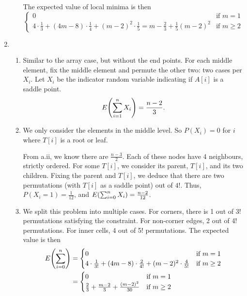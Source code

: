 \documentclass[12pt,a4paper]{article}
\begin{document}
\begin{enumerate}[label=(\alph*)]
\begin{enumerate}[label=(\roman*)]
			The expected value of local minima is then
			$$
			\begin{cases}
				0 & \text{if } m = 1 \\
				4 \cdot \frac{1}{3} + (4m - 8) \cdot \frac{1}{4}
				+ (m - 2)^2 \cdot \frac{1}{5} = m - \frac{2}{3} + \frac{1}{5}(m - 2)^2 & \text{if } m \ge 2
			\end{cases}
			$$


		\end{enumerate}

		\item
		\begin{enumerate}[label=(\roman*)]
			\item Similar to the array case, but without the end points. For each middle element, fix the middle element and permute the other two: two cases per $X_i$. Let $X_i$ be the indicator random variable indicating if $A[i]$ is a saddle point. $$E\parens*{\sum_{i=1}^n X_i} = \frac{n - 2}{3}.$$

			\item We only consider the elements in the middle level. So $P(X_i) = 0$ for $i$ where $T[i]$ is a root or leaf.
			
			From a.ii, we know there are $\frac{n - 3}{2}$. Each of these nodes have 4 neighbours, strictly ordered. For some $T[i]$, we consider its parent, $T[i]$, and its two children. Fixing the parent and $T[i]$, we deduce that there are two permutations (with $T[i]$ as a saddle point) out of $4!$. Thus, $P(X_i = 1) = \frac{1}{12}$, and $E\parens*{\sum_{i=0}^n X_i} = \frac{n - 2}{12}$.
			
			\item We split this problem into multiple cases. For corners, there is 1 out of 3! permutations satisfying the constraint. For non-corner edges, 2 out of 4! permutations. For inner cells, 4 out of 5! permutations. The expected value is then
			\begin{align*}
				E\parens*{\sum_{i=0}^n} &=
				\begin{cases}
					0 & \text{if } m = 1 \\
					4 \cdot \frac{1}{3!} + (4m - 8) \cdot \frac{2}{4!}
					+ (m - 2)^2 \cdot \frac{4}{5!} & \text{if } m \ge 2
				\end{cases} \\
				&= 
				\begin{cases}
					0 & \text{if } m = 1 \\
					\frac{2}{3} + \frac{m - 2}{3}
					+ \frac{(m - 2)^2}{30} & \text{if } m \ge 2
				\end{cases}
			\end{align*}

		\end{enumerate}
	\end{enumerate}
\end{document}
